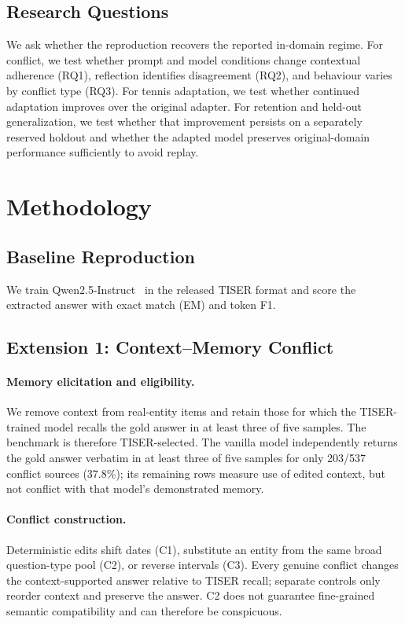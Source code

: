 \documentclass[conference]{IEEEtran}
\begin{document}
\subsection{Research Questions}

We ask whether the reproduction recovers the reported in-domain regime. For conflict, we test whether prompt and model conditions change contextual adherence (RQ1), reflection identifies disagreement (RQ2), and behaviour varies by conflict type (RQ3). For tennis adaptation, we test whether continued adaptation improves over the original adapter. For retention and held-out generalization, we test whether that improvement persists on a separately reserved holdout and whether the adapted model preserves original-domain performance sufficiently to avoid replay.

\section{Methodology}
\label{sec:methodology}

\subsection{Baseline Reproduction}

We train Qwen2.5-Instruct~\cite{qwen2024qwen25} in the released TISER format and score the extracted answer with exact match (EM) and token F1.

\subsection{Extension 1: Context--Memory Conflict}

\paragraph{Memory elicitation and eligibility.}
We remove context from real-entity items and retain those for which the TISER-trained model recalls the gold answer in at least three of five samples. The benchmark is therefore TISER-selected. The vanilla model independently returns the gold answer verbatim in at least three of five samples for only 203/537 conflict sources (37.8\%); its remaining rows measure use of edited context, but not conflict with that model's demonstrated memory.

\paragraph{Conflict construction.}
Deterministic edits shift dates (C1), substitute an entity from the same broad question-type pool (C2), or reverse intervals (C3). Every genuine conflict changes the context-supported answer relative to TISER recall; separate controls only reorder context and preserve the answer. C2 does not guarantee fine-grained semantic compatibility and can therefore be conspicuous.
\end{document}
